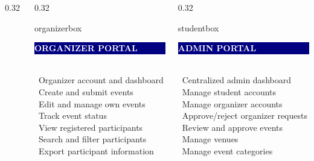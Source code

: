 \documentclass[aspectratio=169,11pt]{beamer}
\begin{document}
\begin{frame}[plain]
\begin{columns}[T,onlytextwidth]
\begin{column}{0.32\textwidth}
    \end{column}

    \begin{column}{0.32\textwidth}

    \begin{beamercolorbox}[wd=\linewidth,rounded=true,sep=0.06cm]{organizerbox}
        \colorbox{navy}{\parbox[c][0.43cm][c]{\dimexpr\linewidth-0.24cm\relax}{
          \hspace{0.10cm}\textcolor{white}{\bfseries\small ORGANIZER PORTAL}
        }}
        \\[3pt]

        {\scriptsize
        \textcolor{purple}{\textbullet}\ Organizer account and dashboard\\[2pt]
        \textcolor{purple}{\textbullet}\ Create and submit events\\[2pt]
        \textcolor{purple}{\textbullet}\ Edit and manage own events\\[2pt]
        \textcolor{purple}{\textbullet}\ Track event status\\[2pt]
        \textcolor{purple}{\textbullet}\ View registered participants\\
        \textcolor{purple}{\textbullet}\ Search and filter participants\\
        \textcolor{purple}{\textbullet}\ Export participant information\\}
      \end{beamercolorbox}
    \end{column}

    
    \begin{column}{0.32\textwidth}


\begin{beamercolorbox}[wd=\linewidth,rounded=true,sep=0.06cm]{studentbox}
        \colorbox{navy}{\parbox[c][0.43cm][c]{\dimexpr\linewidth-0.24cm\relax}{
          \hspace{0.10cm}\textcolor{white}{\bfseries\small ADMIN PORTAL}
        }}
        \\[3pt]

        {\scriptsize
        \textcolor{cyan}{\textbullet}\ Centralized admin dashboard\\[2pt]
        \textcolor{cyan}{\textbullet}\ Manage student accounts\\[2pt]
        \textcolor{cyan}{\textbullet}\ Manage organizer accounts\\[2pt]
        \textcolor{cyan}{\textbullet}\ Approve/reject organizer requests\\[2pt]
        \textcolor{cyan}{\textbullet}\ Review and approve events\\
        \textcolor{cyan}{\textbullet}\ Manage venues\\
        \textcolor{cyan}{\textbullet}\ Manage event categories\\}
      \end{beamercolorbox}


\end{column}
\end{columns}
\end{frame}
\end{document}
